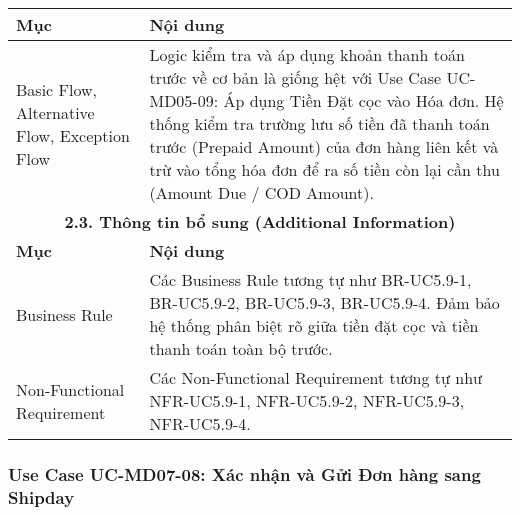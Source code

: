 \begin{longtable}{|m{4cm}|p{11cm}|}
\textbf{Mục} & \textbf{Nội dung} \\
\hline
Basic Flow, Alternative Flow, Exception Flow & Logic kiểm tra và áp dụng khoản thanh toán trước về cơ bản là giống hệt với Use Case UC-MD05-09: Áp dụng Tiền Đặt cọc vào Hóa đơn. Hệ thống kiểm tra trường lưu số tiền đã thanh toán trước (Prepaid Amount) của đơn hàng liên kết và trừ vào tổng hóa đơn để ra số tiền còn lại cần thu (Amount Due / COD Amount). \\
\hline
\multicolumn{2}{|c|}{\textbf{2.3. Thông tin bổ sung (Additional Information)}} \\
\hline
\textbf{Mục} & \textbf{Nội dung} \\
\hline
Business Rule & Các Business Rule tương tự như BR-UC5.9-1, BR-UC5.9-2, BR-UC5.9-3, BR-UC5.9-4. Đảm bảo hệ thống phân biệt rõ giữa tiền đặt cọc và tiền thanh toán toàn bộ trước. \\
\hline
Non-Functional Requirement & Các Non-Functional Requirement tương tự như NFR-UC5.9-1, NFR-UC5.9-2, NFR-UC5.9-3, NFR-UC5.9-4. \\
\hline
\end{longtable}

\subsubsection{Use Case UC-MD07-08: Xác nhận và Gửi Đơn hàng sang Shipday}

